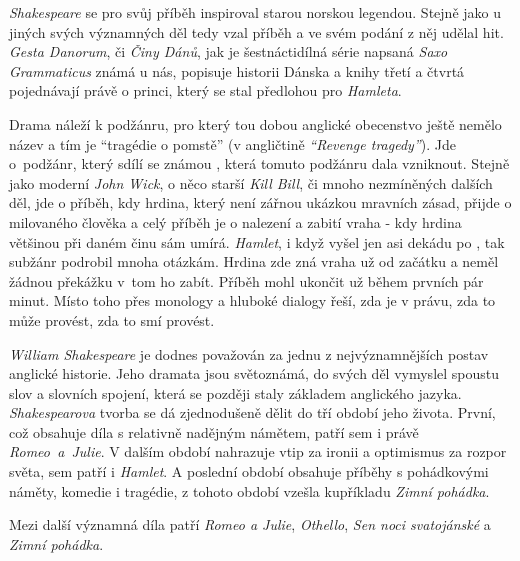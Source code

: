 \documentclass{extarticle} %
\begin{document}
\noindent
\textit{Shakespeare} se pro svůj příběh inspiroval starou norskou legendou.
Stejně jako u jiných svých významných děl tedy vzal příběh a ve svém podání z něj udělal hit.
\textit{Gesta Danorum}, či \textit{Činy Dánů}, jak je šestnáctidílná série napsaná \textit{Saxo Grammaticus} známá u nás, popisuje historii Dánska a knihy třetí a čtvrtá pojednávají právě o princi, který se stal předlohou pro \textit{Hamleta}.

\noindent
Drama náleží k podžánru, pro který tou dobou anglické obecenstvo ještě nemělo název a tím je \enquote{tragédie o pomstě} (v angličtině \textit{\enquote{Revenge tragedy}}).
Jde o~podžánr, který sdílí se známou , která tomuto podžánru dala vzniknout.
Stejně jako moderní \textit{John Wick}, o něco starší \textit{Kill Bill}, či mnoho nezmíněných dalších děl, jde o příběh, kdy hrdina, který není zářnou ukázkou mravních zásad, přijde o milovaného člověka a celý příběh je o nalezení a zabití vraha - kdy hrdina většinou při daném činu sám umírá.
\textit{Hamlet}, i když vyšel jen asi dekádu po , tak subžánr podrobil mnoha otázkám.
Hrdina zde zná vraha už od začátku a neměl žádnou překážku v~tom ho zabít.
Příběh mohl ukončit už během prvních pár minut.
Místo toho přes monology a hluboké dialogy řeší, zda je v právu, zda to může provést, zda to smí provést.



\noindent 
\textit{William Shakespeare} je dodnes považován za jednu z nejvýznamnějších postav anglické historie.
Jeho dramata jsou světoznámá, do svých děl vymyslel spoustu slov a slovních spojení, která se později staly základem anglického jazyka. \\
\textit{Shakespearova} tvorba se dá zjednodušeně dělit do tří období jeho života.
První, což obsahuje díla s relativně nadějným námětem, patří sem i právě \textit{Romeo~a~Julie}.
V dalším období nahrazuje vtip za ironii a optimismus za rozpor světa, sem patří i \textit{Hamlet}.
A poslední období obsahuje příběhy s pohádkovými náměty, komedie i tragédie, z tohoto období vzešla kupříkladu \textit{Zimní pohádka}.

\noindent 
Mezi další významná díla patří \textit{Romeo a Julie}, \textit{Othello}, \textit{Sen noci svatojánské} a \textit{Zimní pohádka}.
\end{document}
